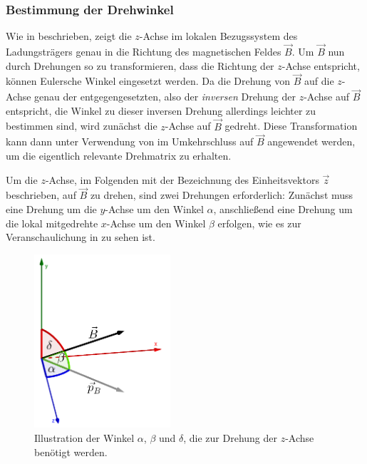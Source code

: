 \subsubsection{Bestimmung der Drehwinkel}
\label{sec:drehwinkel}

Wie in  beschrieben, zeigt die \(z\)-Achse im lokalen Bezugssystem des Ladungstr\"agers genau in die
Richtung des magnetischen Feldes \(\vec{B}\). Um \(\vec{B}\) nun durch Drehungen so zu transformieren, dass die Richtung der
\(z\)-Achse entspricht, k\"onnen Eulersche Winkel eingesetzt werden. Da die Drehung von \(\vec{B}\) auf die \(z\)-Achse genau der
entgegengesetzten, also der \textit{inversen} Drehung der \(z\)-Achse auf \(\vec{B}\) entspricht, die Winkel zu dieser inversen
Drehung allerdings leichter zu bestimmen sind, wird zun\"achst die \(z\)-Achse auf \(\vec{B}\) gedreht. Diese Transformation kann
dann unter Verwendung von  im Umkehrschluss auf \(\vec{B}\) angewendet werden, um die eigentlich relevante
Drehmatrix zu erhalten.

Um die \(z\)-Achse, im Folgenden mit der Bezeichnung des Einheitsvektors \(\vec{z}\) beschrieben, auf \(\vec{B}\) zu drehen, sind
zwei Drehungen erforderlich: Zun\"achst muss eine Drehung um die \(y\)-Achse um den Winkel \(\alpha\), anschlie{\ss}end eine Drehung
um die lokal mitgedrehte \(x\)-Achse um den Winkel \(\beta\) erfolgen, wie es zur Veranschaulichung in  zu sehen
ist.

\begin{figure}[h]
  \centering
  \includegraphics[width=0.45\textwidth]{../geogebra/img/winkel_edited}
  \caption{Illustration der Winkel \(\alpha\), \(\beta\) und \(\delta\), die zur Drehung der \(z\)-Achse ben\"otigt werden.}
  \label{fig:winkelfig}
\end{figure}

